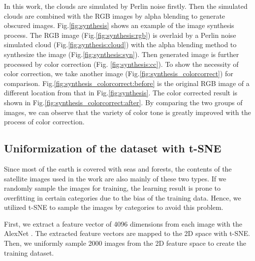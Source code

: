 \documentclass[10pt,twocolumn,letterpaper]{article}
\begin{document}
In this work, the clouds are simulated by Perlin noise \cite{perlin2002improving} firstly. Then the simulated  clouds are combined with the RGB images by alpha blending to generate obscured images. Fig.\ref{fig:synthesis} shows an example of the image synthesis process. The RGB image (Fig.\ref{fig:synthesis:rgb}) is  overlaid by a Perlin noise simulated cloud (Fig.\ref{fig:synthesis:cloud}) with the alpha blending method to synthesize the image (Fig.\ref{fig:synthesis:syn}). Then generated image is further processed by color correction (Fig. \ref{fig:synthesis:cc}). To show the necessity of color correction, we take another image (Fig.\ref{fig:synthesis_colorcorrect}) for comparison. Fig.\ref{fig:synthesis_colorcorrect:before} is the original RGB image of a different location from that in Fig.\ref{fig:synthesis}. The color corrected result is shown in Fig.\ref{fig:synthesis_colorcorrect:after}. By comparing the two groups of images, we can observe that the variety of color tone is greatly improved with the process of color correction.

\subsection{Uniformization of the dataset with t-SNE}
Since most of the earth is covered with seas and forests, the contents of the satellite images used in the work are also mainly of these two types. If we randomly sample the images for training, the learning result is prone to overfitting in certain categories due to the bias of the training data. Hence, we utilized t-SNE to sample the images by categories to avoid this problem.

First, we extract a feature vector of 4096 dimensions from each image with the AlexNet \cite{NIPS2012_4824}. The extracted feature vectors are mapped to the 2D space with t-SNE. Then, we uniformly sample 2000 images from the 2D feature space to create the training dataset.
\end{document}
